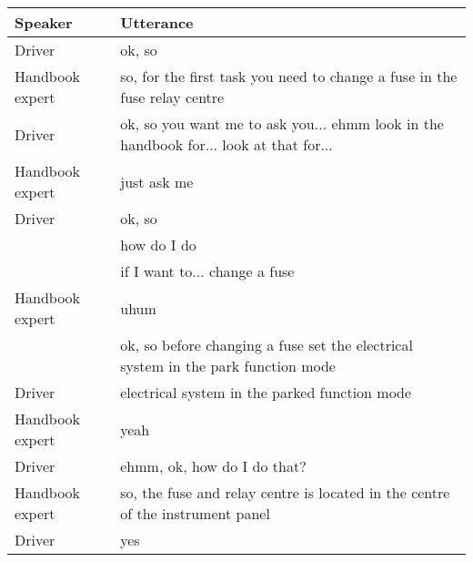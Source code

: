 \begin{table}[H]
\begin{tabular}{p{3cm}p{8cm}}
Speaker & Utterance \\
\hline
Driver          & ok, so                                                                                                                  \\
Handbook expert & so, for the first task you need to change a fuse in the fuse relay centre                                               \\
Driver          & ok, so you want me to ask you... ehmm look in the handbook for... look at that for...                                   \\
Handbook expert & just ask me                                                                                                             \\
Driver          & ok, so                                                                                                                  \\
                & how do I do                                                                                                             \\
                & if I want to... change a fuse                                                                                           \\
Handbook expert & uhum                                                                                                                    \\
                & ok, so before changing a fuse set the electrical system in the park function mode                                       \\
Driver          & electrical system in the parked function mode                                                                           \\
Handbook expert & yeah                                                                                                                    \\
Driver          & ehmm, ok, how do I do that?                                                                                             \\
Handbook expert & so, the fuse and relay centre is located in the centre of the instrument panel                                          \\
Driver          & yes                                                                                                                     \\

\end{tabular}
\end{table}
